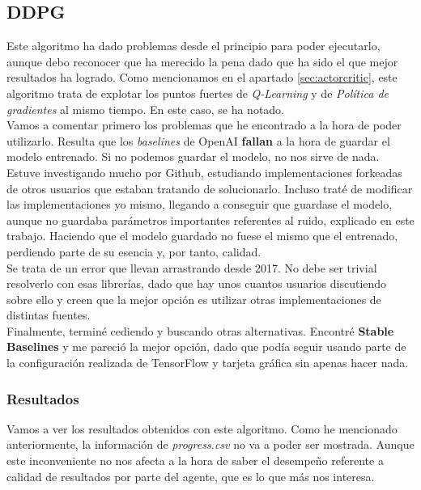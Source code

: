 \documentclass[11pt,fleqn]{book} %
\begin{document}
\subsection{DDPG}\label{sec:mountain:DDPG}

Este algoritmo ha dado problemas desde el principio para poder ejecutarlo, aunque debo reconocer que ha merecido la pena dado que ha sido el que mejor resultados ha logrado. Como mencionamos en el apartado \ref{sec:actorcritic}, este algoritmo trata de explotar los puntos fuertes de \textit{Q-Learning} y de \textit{Política de gradientes} al mismo tiempo. En este caso, se ha notado. \\

Vamos a comentar primero los problemas que he encontrado a la hora de poder utilizarlo. Resulta que los \textit{baselines} de OpenAI \textbf{fallan} a la hora de guardar el modelo entrenado. Si no podemos guardar el modelo, no nos sirve de nada. \\

Estuve investigando mucho por Github, estudiando implementaciones forkeadas de otros usuarios que estaban tratando de solucionarlo. Incluso traté de modificar las implementaciones yo mismo, llegando a conseguir que guardase el modelo, aunque no guardaba parámetros importantes referentes al ruido, explicado en este trabajo. Haciendo que el modelo guardado no fuese el mismo que el entrenado, perdiendo parte de su esencia y, por tanto, calidad.\cite{article:ddpgError1}\\

Se trata de un error que llevan arrastrando desde 2017. No debe ser trivial resolverlo con esas librerías, dado que hay unos cuantos usuarios discutiendo sobre ello y creen que la mejor opción es utilizar otras implementaciones de distintas fuentes. \\

Finalmente, terminé cediendo y buscando otras alternativas. Encontré \textbf{Stable Baselines} y me pareció la mejor opción, dado que podía seguir usando parte de la configuración realizada de TensorFlow y tarjeta gráfica sin apenas hacer nada.



\subsubsection{Resultados}

Vamos a ver los resultados obtenidos con este algoritmo. Como he mencionado anteriormente, la información de \textit{progress.csv} no va a poder ser mostrada. Aunque este inconveniente no nos afecta a la hora de saber el desempeño referente a calidad de resultados por parte del agente, que es lo que más nos interesa. \\
\end{document}
